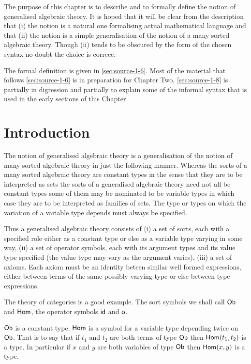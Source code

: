 
The purpose of this chapter is to describe and to formally define the notion of generalised algebraic theory.
%
It is hoped that it will be clear from the description that (i) the notion is a natural one formalising actual mathematical language and that (ii) the notion is a simple generalisation of the notion of a many sorted algebraic theory.
%
%
Though (ii) tends to be obscured by the form of the chosen syntax no doubt the choice is correce.

The formal definition is given in \textsection \ref{sec:source-1-6}.
%
Most of the material that follows \textsection \ref{sec:source-1-6} is in preparation for Chapter Two, \textsection \ref{sec:source-1-8} is partially in digression and partially to explain some of the informal syntax that is used in the early sections of this Chapter.

\section{Introduction} \label{sec:source-1-1}

The notion of generalised algebraic theory is a generalisation of the notion of many sorted algebraic theory in just the following manner.
%
Whereas the sorts of a many sorted algebraic theory are constant types in the sense that they are to be interpreted as sets the sorts of a generalised algebraic theory need not all be constant types some of them may be nominated to be variable types in which case they are to be interpreted as families of sets.
%
The type or types on which the variation of a variable type depends must always be specified.

Thus a generalised algebraic theory consists of (i) a set of sorts, each with a specified role either as a constant type or else as a variable type varying in some way, (ii) a set of operator symbols, each with its argument types and its value type specified (the value type may vary as the argument varies), (iii) a set of axioms.
%
%
Each axiom must be an identity beteen similar well formed expressions, either between terms of the same possibly varying type or else between type expressions.

The theory of categories is a good example.
%
The sort symbols we shall call $\mathsf{Ob}$ and $\mathsf{Hom}$, the operator symbols $\mathsf{id}$ and $\mathsf{o}$.

$\mathsf{Ob}$ is a constant type.  $\mathsf{Hom}$ is a symbol for a variable type depending twice on $\mathsf{Ob}$.
%
That is to say that if $t_1$ and $t_2$ are both terms of type $\mathsf{Ob}$ then $\mathsf{Hom}(t_1,t_2)$ is a type.
%
In particular if $x$ and $y$ are both variables of type $\mathsf{Ob}$ then $\mathsf{Hom}(x,y)$ is a type.

